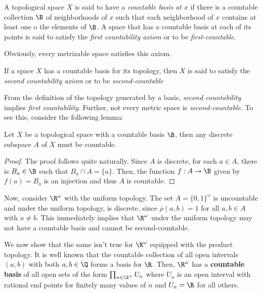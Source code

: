 \begin{definition}
    A topological space $X$ is said to have a \textit{countable basis at $x$} if there is a countable collection $\B$ of neighborhoods of $x$ such that each neighborhood of $x$ contains at least one o the elements of $\B$. A space that has a countable basis at each of its points is said to satisfy the \textit{first countability axiom} or to be \textit{first-countable}.
\end{definition}

Obviously, every metrizable space satisfies this axiom.

\begin{definition}
    If a space $X$ has a countable basis for its topology, then $X$ is said to satisfy the \textit{second countability axiom} or to be \textit{second-countable}
\end{definition}

From the definition of the topology generated by a basis, \textit{second countability} implies \textit{first countability}. Further, not every metric space is \textit{second-countable}. To see this, consider the following lemma:
\begin{lemma}
    Let $X$ be a topological space with a countable basis $\B$, then any discrete subspace $A$ of $X$ must be countable.
\end{lemma}
\begin{proof}
    The proof follows quite naturally. Since $A$ is discrete, for each $a\in A$, there is $B_a\in\B$ such that $B_a\cap A = \{a\}$. Then, the function $f:A\to\B$ given by $f(a) = B_a$ is an injection and thus $A$ is countable.
\end{proof}

Now, consider $\R^\omega$ with the uniform topology. The set $A = \{0,1\}^\omega$ is uncountable and under the uniform topology, is discrete, since $\overline{\rho}(a,b) = 1$ for all $a,b\in A$ with $a\ne b$. This immediately implies that $\R^\omega$ under the uniform topology may not have a countable basis and cannot be second-countable.

We now show that the same isn't true for $\R^\omega$ equipped with the product topology. It is well known that the countable collection of all open intervals $(a,b)$ with both $a,b\in\Q$ forms a basis for $\R$. Then, $\R^\omega$ has a \textbf{countable basis} of all open sets of the form $\prod_{n\in\Z^+}U_n$ where $U_n$ is an open interval with rational end points for finitely many values of $n$ and $U_n = \R$ for all others.
